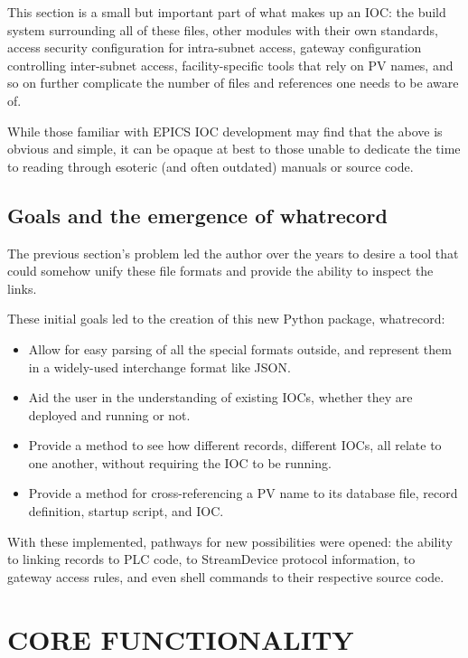 \documentclass[letter,
               keeplastbox,   %
               ]{jacow}
\begin{document}
This section is a small but important part of what makes up an IOC: the build
system surrounding all of these files, other modules with their own standards,
access security configuration for intra-subnet access, gateway configuration
controlling inter-subnet access, facility-specific tools that rely on PV
names, and so on further complicate the number of files and references
one needs to be aware of.

While those familiar with EPICS IOC development may find that the above is
obvious and simple, it can be opaque at best to those unable to dedicate the
time to reading through esoteric (and often outdated) manuals or source
code.

\subsection{Goals and the emergence of whatrecord}

The previous section's problem led the author over the years to desire a tool
that could somehow unify these file formats and provide the ability to inspect
the links.

These initial goals led to the creation of this new Python package, whatrecord:
\begin{itemize}
  \item Allow for easy parsing of all the special formats outside, and
    represent them in a widely-used interchange format like JSON.
  \item Aid the user in the understanding of existing IOCs, whether they are
    deployed and running or not.
  \item Provide a method to see how different records, different IOCs, all
    relate to one another, without requiring the IOC to be running.
  \item Provide a method for cross-referencing a PV name to its database
    file, record definition, startup script, and IOC.
\end{itemize}

With these implemented, pathways for new possibilities were opened: the ability
to linking records to PLC code, to StreamDevice protocol information, to
gateway access rules, and even shell commands to their respective source code.

\section{CORE FUNCTIONALITY}
\end{document}
